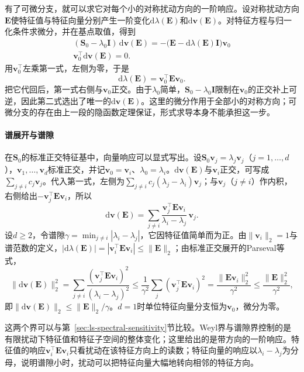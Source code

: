 有了可微分支，就可以求它对每个小的对称扰动方向的一阶响应。设对称扰动方向$\bm E$使特征值与特征向量分别产生一阶变化$\mathrm d\lambda(\bm E)$和$\mathrm d\bm v(\bm E)$。对特征方程与归一化条件求微分，并在基点取值，得到
\[
 \begin{gathered}
(\bm S_0-\lambda_0\bm I)\,\mathrm d\bm v(\bm E)
 =-\bigl(\bm E-\mathrm d\lambda(\bm E)\bm I\bigr)\bm v_0\\
\bm v_0^\top\mathrm d\bm v(\bm E)=0.
 \end{gathered}
\]
用$\bm v_0^\top$左乘第一式，左侧为零，于是
\[
 \mathrm d\lambda(\bm E)=\bm v_0^\top\bm E\bm v_0.
\]
把它代回后，第一式右侧与$\bm v_0$正交。由于$\lambda_0$简单，$\bm S_0-\lambda_0\bm I$限制在$\bm v_0$的正交补上可逆，因此第二式选出了唯一的$\mathrm d\bm v(\bm E)$。这里的微分作用于全部小的对称方向；可微分支的存在由上一段的隐函数定理保证，形式求导本身不能承担这一步。

\paragraph{谱展开与谱隙}
在$\bm S_0$的标准正交特征基中，向量响应可以显式写出。设$\bm S_0\bm v_j=\lambda_j\bm v_j$（$j=1,\ldots,d$），$\bm v_1,\ldots,\bm v_d$标准正交，并记$\bm v_0=\bm v_i$、$\lambda_0=\lambda_i$。$\mathrm d\bm v(\bm E)$与$\bm v_i$正交，可写成$\sum_{j\neq i}c_j\bm v_j$。代入第一式，左侧为$\sum_{j\neq i}c_j(\lambda_j-\lambda_i)\bm v_j$；与$\bm v_j$（$j\neq i$）作内积，右侧给出$-\bm v_j^\top\bm E\bm v_i$，所以
\[
 \mathrm d\bm v(\bm E)=\sum_{j\neq i}\frac{\bm v_j^\top\bm E\bm v_i}{\lambda_i-\lambda_j}\,\bm v_j .
\]
设$d\geq2$，令谱隙$\gamma=\min_{j\neq i}|\lambda_i-\lambda_j|$，它因特征值简单而为正。由$\lVert\bm v_i\rVert_2=1$与谱范数的定义，$|\mathrm d\lambda(\bm E)|=|\bm v_i^\top\bm E\bm v_i|\leq\lVert\bm E\rVert_2$；由标准正交展开的Parseval等式，
\[
 \lVert\mathrm d\bm v(\bm E)\rVert_2^2=\sum_{j\neq i}\frac{(\bm v_j^\top\bm E\bm v_i)^2}{(\lambda_i-\lambda_j)^2}
 \leq\frac1{\gamma^2}\sum_{j}(\bm v_j^\top\bm E\bm v_i)^2=\frac{\lVert\bm E\bm v_i\rVert_2^2}{\gamma^2}\leq\frac{\lVert\bm E\rVert_2^2}{\gamma^2},
\]
即$\lVert\mathrm d\bm v(\bm E)\rVert_2\leq\lVert\bm E\rVert_2/\gamma$。$d=1$时单位特征向量分支恒为$\bm v_0$，微分为零。

这两个界可以与第~\ref{sec:ls-spectral-sensitivity}节比较。Weyl界与谱隙界控制的是有限扰动下特征值和特征子空间的整体变化；这里给出的是带方向的一阶响应。特征值的响应$\bm v_i^\top\bm E\bm v_i$只看扰动在该特征方向上的读数；特征向量的响应以$\lambda_i-\lambda_j$为分母，说明谱隙小时，扰动可以把特征向量大幅地转向相邻的特征方向。

